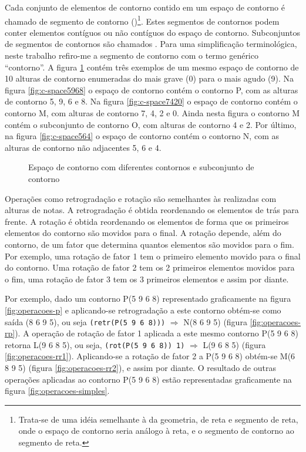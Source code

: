 Cada conjunto de elementos de contorno contido em um espaço de
contorno é chamado de segmento de contorno ()\footnote{Trata-se de uma idéia semelhante à da
  geometria, de reta e segmento de reta, onde o espaço de contorno
  seria análogo à reta, e o segmento de contorno ao segmento de
  reta.}. Estes segmentos de contornos podem conter elementos
contíguos ou não contíguos do espaço de contorno. Subconjuntos de
segmentos de contornos são chamados . Para uma simplificação terminológica, neste trabalho
refiro-me a segmento de contorno com o termo genérico ``contorno''. A
figura \ref{fig:c-space} contém três exemplos de um mesmo espaço de
contorno de 10 alturas de contorno enumeradas do mais grave (0) para o
mais agudo (9). Na figura \ref{fig:c-space5968} o espaço de contorno
contém o contorno P, com as alturas de contorno 5, 9, 6 e 8. Na figura
\ref{fig:c-space7420} o espaço de contorno contém o contorno M, com
alturas de contorno 7, 4, 2 e 0. Ainda nesta figura o contorno M
contém o subconjunto de contorno O, com alturas de contorno 4 e 2. Por
último, na figura \ref{fig:c-space564} o espaço de contorno contém o
contorno N, com as alturas de contorno não adjacentes 5, 6 e 4.

\begin{figure}
  \centering

  \caption{Espaço de contorno com diferentes contornos e subconjunto
    de contorno}
  \label{fig:c-space}
\end{figure}

Operações como retrogradação e rotação são semelhantes às realizadas
com alturas de notas. A retrogradação é obtida reordenando os
elementos de trás para frente. A rotação é obtida reordenando os
elementos de forma que os primeiros elementos do contorno são movidos
para o final. A rotação depende, além do contorno, de um fator que
determina quantos elementos são movidos para o fim. Por exemplo, uma
rotação de fator 1 tem o primeiro elemento movido para o final do
contorno. Uma rotação de fator 2 tem os 2 primeiros elementos movidos
para o fim, uma rotação de fator 3 tem os 3 primeiros elementos e
assim por diante.

Por exemplo, dado um contorno P(5 9 6 8) representado graficamente na
figura \ref{fig:operacoes-p} e aplicando-se retrogradação a este
contorno obtém-se como saída (8 6 9 5), ou seja
\verb!(retr(P(5 9 6 8)))! $\Rightarrow$ N(8 6 9 5) (figura
\ref{fig:operacoes-rp}). A operação de rotação de fator 1 aplicada a
este mesmo contorno P(5 9 6 8) retorna L(9 6 8 5), ou seja,
\verb!(rot(P(5 9 6 8)) 1)! $\Rightarrow$ L(9 6 8 5) (figura
\ref{fig:operacoes-rr1}). Aplicando-se a rotação de fator 2 a P(5 9 6
8) obtém-se M(6 8 9 5) (figura \ref{fig:operacoes-rr2}), e assim por
diante. O resultado de outras operações aplicadas ao contorno P(5 9 6
8) estão representadas graficamente na figura
\ref{fig:operacoes-simples}.

